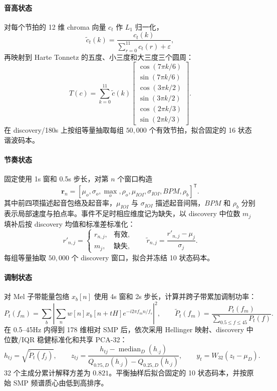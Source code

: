 \documentclass{article}
\begin{document}
\paragraph{音高状态}
对每个节拍的 12 维 chroma 向量 $c_t$ 作 $L_1$ 归一化，
\[\widetilde c_t(k)=\frac{c_t(k)}{\sum_{r=0}^{11}c_t(r)+\varepsilon},\]
再映射到 Harte Tonnetz 的五度、小三度和大三度三个圆周：
\[
T(c)=\sum_{k=0}^{11}\widetilde c(k)
\begin{bmatrix}
\cos(7\pi k/6)\\ \sin(7\pi k/6)\\
\cos(3\pi k/2)\\ \sin(3\pi k/2)\\
\cos(2\pi k/3)\\ \sin(2\pi k/3)
\end{bmatrix}.
\]
在 discovery/180s 上按组等量抽取每组 $50,000$ 个有效节拍，拟合固定的 16 状态谐波码本\cite{10.1145/1178723.1178727}。

\paragraph{节奏状态}
固定使用 1s 窗和 0.5s 步长，对第 $n$ 个窗口构造
\[\mathbf r_n=[\mu_o,\sigma_o,\operatorname{max}_o,\rho_o,\mu_{IOI},\sigma_{IOI},BPM,\rho_b]^\mathsf T.\]
其中前四项描述起音包络及起音率，$\mu_{IOI}$ 与 $\sigma_{IOI}$ 描述起音间隔，$BPM$ 和 $\rho_b$ 分别表示局部速度与拍点率。事件不足时相应维度记为缺失，以 discovery 中位数 $m_j$ 填补后按 discovery 均值和标准差标准化：
\[
r'_{n,j}=\begin{cases}r_{n,j},&\text{有效},\\m_j,&\text{缺失},\end{cases}
\qquad
\widetilde r_{n,j}=\frac{r'_{n,j}-\mu_j}{\sigma_j}.
\]
每组等量抽取 $50,000$ 个 discovery 窗口，拟合并冻结 10 状态码本。

\paragraph{调制状态}
对 Mel 子带能量包络 $x_b[n]$ 使用 4s 窗和 2s 步长，计算并跨子带累加调制功率：
\[
P_t(f_m)=\sum_b\left|\sum_n w[n]x_b[n+tH]e^{-i2\pi f_mn/f_s}\right|^2,
\qquad
\widetilde P_t(f_m)=\frac{P_t(f_m)}{\sum_{0.5\le f\le45}P_t(f)}.
\]
在 0.5--45Hz 内得到 178 维相对 SMP 后，依次采用 Hellinger 映射、discovery 中位数/IQR 稳健标准化和共享 PCA-32：
\[
h_{tj}=\sqrt{\widetilde P_t(f_j)},\qquad
z_{tj}=\frac{h_{tj}-\operatorname{median}_D(h_{\cdot j})}
{Q_{0.75,D}(h_{\cdot j})-Q_{0.25,D}(h_{\cdot j})},
\qquad y_t=W_{32}(z_t-\mu_D).
\]
32 个主成分累计解释方差为 $0.821$。平衡抽样后拟合固定的 10 状态码本，并按原始 SMP 频谱质心由低到高排序。
\end{document}
